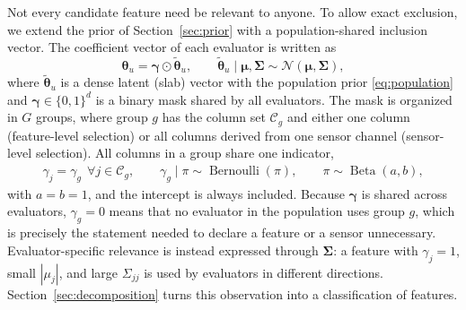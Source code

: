 \documentclass[lettersize,journal]{IEEEtran}
\newcommand{\Normal}{\mathcal{N}}
\newcommand{\Bern}{\operatorname{Bernoulli}}
\newcommand{\Beta}{\operatorname{Beta}}
\newcommand{\thetatil}{\widetilde{\bm\theta}}
\begin{document}
Not every candidate feature need be relevant to anyone. To allow exact exclusion, we extend the prior of Section~\ref{sec:prior} with a population-shared inclusion vector. The coefficient vector of each evaluator is written as
\begin{equation}
 \bm\theta_u=\bm\gamma\odot\thetatil_u,\qquad
 \thetatil_u\mid\bm\mu,\bm\Sigma\sim\Normal(\bm\mu,\bm\Sigma),
 \label{eq:slab}
\end{equation}
where $\thetatil_u$ is a dense latent (slab) vector with the population prior \eqref{eq:population} and $\bm\gamma\in\{0,1\}^d$ is a binary mask shared by all evaluators. The mask is organized in $G$ groups, where group $g$ has the column set $\mathcal{C}_g$ and either one column (feature-level selection) or all columns derived from one sensor channel (sensor-level selection). All columns in a group share one indicator,
\begin{align}
 \gamma_j=\gamma_g\ \ \forall j\in\mathcal{C}_g,\qquad
 \gamma_g\mid\pi\sim\Bern(\pi),\qquad
 \pi\sim\Beta(a,b),
 \label{eq:spikeslab}
\end{align}
with $a=b=1$, and the intercept is always included. Because $\bm\gamma$ is shared across evaluators, $\gamma_g=0$ means that no evaluator in the population uses group $g$, which is precisely the statement needed to declare a feature or a sensor unnecessary. Evaluator-specific relevance is instead expressed through $\bm\Sigma$: a feature with $\gamma_j=1$, small $|\mu_j|$, and large $\Sigma_{jj}$ is used by evaluators in different directions. Section~\ref{sec:decomposition} turns this observation into a classification of features.
\end{document}
